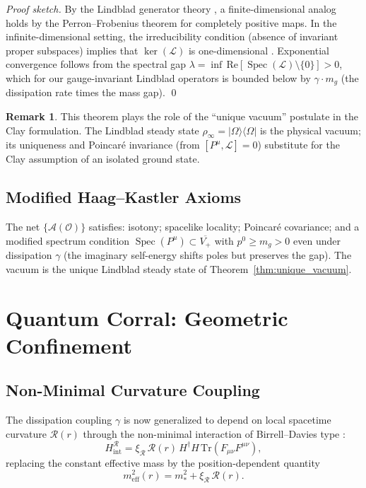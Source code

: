 \documentclass[12pt,a4paper]{article}
\theoremstyle{definition}
\newtheorem{remark}[theorem]{Remark}
\newcommand{\Traza}{\mathrm{Tr}}
\DeclareMathOperator{\Spec}{Spec}
\newcommand{\meff}{m_{\mathrm{eff}}}
\begin{document}
\begin{proof}[Proof sketch]
By the Lindblad generator theory \cite{Lindblad}, a finite-dimensional
analog holds by the Perron--Frobenius theorem for completely positive maps.
In the infinite-dimensional setting, the irreducibility condition
(absence of invariant proper subspaces) implies that $\ker(\mathcal{L})$
is one-dimensional \cite{Frigerio1978}. Exponential convergence follows
from the spectral gap $\lambda = \inf\,\mathrm{Re}[\Spec(\mathcal{L})
\setminus \{0\}] > 0$, which for our gauge-invariant Lindblad operators
is bounded below by $\gamma \cdot m_{g}$ (the dissipation rate times
the mass gap). \qed
\end{proof}

\begin{remark}
This theorem plays the role of the ``unique vacuum'' postulate in the Clay
formulation. The Lindblad steady state $\rho_{\infty} = |\Omega\rangle
\langle\Omega|$ is the physical vacuum; its uniqueness and Poincar\'{e}
invariance (from $[P^{\mu}, \mathcal{L}] = 0$) substitute for the Clay
assumption of an isolated ground state.
\end{remark}

\subsection{Modified Haag--Kastler Axioms}

The net $\{\mathcal{A}(\mathcal{O})\}$ satisfies: isotony; spacelike
locality; Poincar\'{e} covariance; and a modified spectrum condition
$\Spec(P^{\mu}) \subset \overline{V_{+}}$ with $p^{0} \geq m_{g} > 0$
even under dissipation $\gamma$ (the imaginary self-energy shifts poles
but preserves the gap). The vacuum is the unique Lindblad steady state
of Theorem~\ref{thm:unique_vacuum}.

\section{Quantum Corral: Geometric Confinement}
\label{sec:corral}

\subsection{Non-Minimal Curvature Coupling}

The dissipation coupling $\gamma$ is now generalized to depend on local
spacetime curvature $\mathcal{R}(r)$ through the non-minimal interaction
of Birrell--Davies type \cite{Birrell1982}:
\begin{equation}
  H_{\mathrm{int}}^{\mathcal{R}}
  = \xi_{\mathcal{R}}\,\mathcal{R}(r)\,
    H^{\dagger}H\,\Traza(F_{\mu\nu}F^{\mu\nu}),
  \label{eq:curvature_coupling}
\end{equation}
replacing the constant effective mass by the position-dependent quantity
\begin{equation}
  \meff^{2}(r) = m_{*}^{2} + \xi_{\mathcal{R}}\,\mathcal{R}(r).
  \label{eq:meff}
\end{equation}
\end{document}
